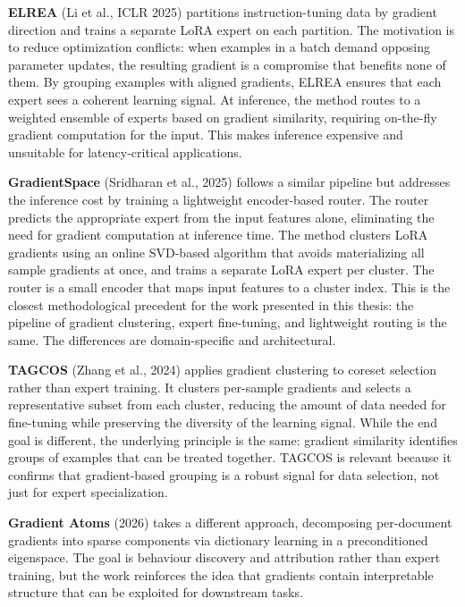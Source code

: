 \textbf{ELREA} (Li et al., ICLR 2025) partitions instruction-tuning data by gradient direction and trains a separate LoRA expert on each partition. The motivation is to reduce optimization conflicts: when examples in a batch demand opposing parameter updates, the resulting gradient is a compromise that benefits none of them. By grouping examples with aligned gradients, ELREA ensures that each expert sees a coherent learning signal. At inference, the method routes to a weighted ensemble of experts based on gradient similarity, requiring on-the-fly gradient computation for the input. This makes inference expensive and unsuitable for latency-critical applications.


\textbf{GradientSpace} (Sridharan et al., 2025) follows a similar pipeline but addresses the inference cost by training a lightweight encoder-based router. The router predicts the appropriate expert from the input features alone, eliminating the need for gradient computation at inference time. The method clusters LoRA gradients using an online SVD-based algorithm that avoids materializing all sample gradients at once, and trains a separate LoRA expert per cluster. The router is a small encoder that maps input features to a cluster index. This is the closest methodological precedent for the work presented in this thesis: the pipeline of gradient clustering, expert fine-tuning, and lightweight routing is the same. The differences are domain-specific and architectural.

\textbf{TAGCOS} (Zhang et al., 2024) applies gradient clustering to coreset selection rather than expert training. It clusters per-sample gradients and selects a representative subset from each cluster, reducing the amount of data needed for fine-tuning while preserving the diversity of the learning signal. While the end goal is different, the underlying principle is the same: gradient similarity identifies groups of examples that can be treated together. TAGCOS is relevant because it confirms that gradient-based grouping is a robust signal for data selection, not just for expert specialization.


\textbf{Gradient Atoms} (2026) takes a different approach, decomposing per-document gradients into sparse components via dictionary learning in a preconditioned eigenspace. The goal is behaviour discovery and attribution rather than expert training, but the work reinforces the idea that gradients contain interpretable structure that can be exploited for downstream tasks.


